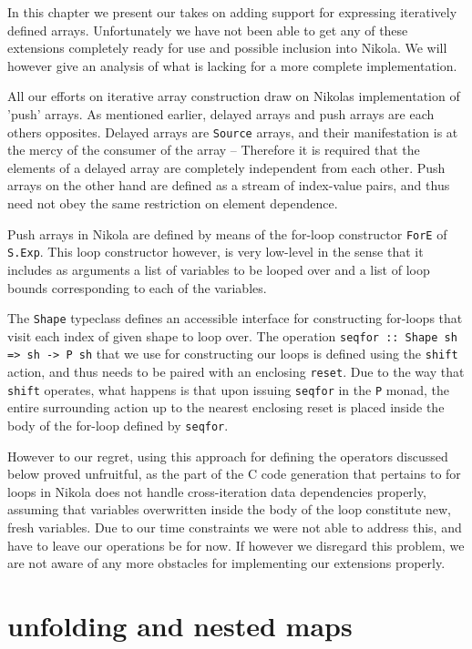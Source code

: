In this chapter we present our takes on adding support for expressing
iteratively defined arrays.  Unfortunately we have not been able to get any of
these extensions completely ready for use and possible inclusion into Nikola.
We will however give an analysis of what is lacking for a more complete
implementation.

All our efforts on iterative array construction draw on Nikolas implementation
of 'push' arrays. As mentioned earlier, delayed arrays and push arrays are each
others opposites. Delayed arrays are \texttt{Source} arrays, and their
manifestation is at the mercy of the consumer of the array -- Therefore it is
required that the elements of a delayed array are completely independent from
each other.  Push arrays on the other hand are defined as a stream of
index-value pairs, and thus need not obey the same restriction on element
dependence.

Push arrays in Nikola are defined by means of the for-loop constructor \texttt{ForE}
of \texttt{S.Exp}. This loop constructor however, is very low-level in the
sense that it includes as arguments a list of variables to be looped over and a
list of loop bounds corresponding to each of the variables.

The \texttt{Shape} typeclass defines an accessible interface for constructing
for-loops that visit each index of given shape to loop over.  The operation
\texttt{seqfor :: Shape sh => sh -> P sh} that we use for constructing our
loops is defined using the \texttt{shift} action, and thus needs to be paired
with an enclosing \texttt{reset}.  Due to the way that \texttt{shift} operates,
what happens is that upon issuing \texttt{seqfor} in the \texttt{P} monad, the
entire surrounding action up to the nearest enclosing reset is placed inside
the body of the for-loop defined by \texttt{seqfor}.

However to our regret, using this approach for defining the operators discussed
below proved unfruitful, as the part of the C code generation that pertains to
for loops in Nikola does not handle cross-iteration data dependencies properly,
assuming that variables overwritten inside the body of the loop constitute new,
fresh variables. Due to our time constraints we were not able to address this,
and have to leave our operations be for now. If however we disregard this
problem, we are not aware of any more obstacles for implementing our extensions
properly.

\section{unfolding and nested maps}

